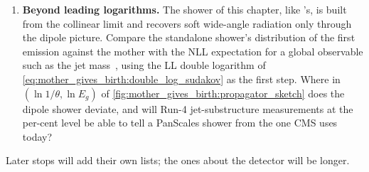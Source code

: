 \begin{enumerate}
    will actually constrain the shower rather than the underlying event?
  \item \textbf{Beyond leading logarithms.} The shower of this chapter, like
    \PYTHIA's, is built from the collinear limit and recovers soft
    wide-angle radiation only through the dipole picture. Compare the
    standalone shower's distribution of the first emission against the
    mother with the NLL expectation for a global observable such as the
    jet mass~\cite{Dasgupta:2020fwr}, using the LL double logarithm of
    \cref{eq:mother_gives_birth:double_log_sudakov} as the first step. Where
    in $(\ln1/\theta,\ln E_g)$ of \cref{fig:mother_gives_birth:propagator_sketch}
    does the dipole shower deviate, and will Run-4 jet-substructure
    measurements at the per-cent level be able to tell a PanScales shower
    from the one CMS uses today?
\end{enumerate}
Later stops will add their own lists; the ones about the detector will be
longer.
